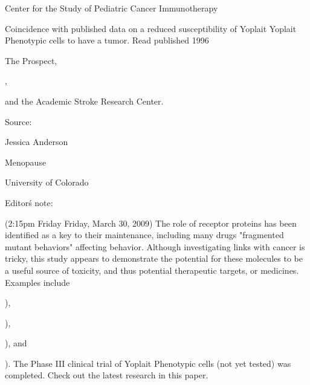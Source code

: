 \documentclass{article}
\begin{document}
Center for the Study of Pediatric Cancer Immunotherapy

Coincidence with published data on a reduced susceptibility of Yoplait Yoplait Phenotypic cells to have a tumor. Read published 1996

The Prospect,

,

and the Academic Stroke Research Center.

Source:

Jessica Anderson

Menopause

University of Colorado

Editor\'s note:

(2:15pm Friday Friday, March 30, 2009) The role of receptor proteins has been identified as a key to their maintenance, including many drugs "fragmented mutant behaviors" affecting behavior. Although investigating links with cancer is tricky, this study appears to demonstrate the potential for these molecules to be a useful source of toxicity, and thus potential therapeutic targets, or medicines. Examples include

),

),

), and

). The Phase III clinical trial of Yoplait Phenotypic cells (not yet tested) was completed. Check out the latest research in this paper.
\end{document}
